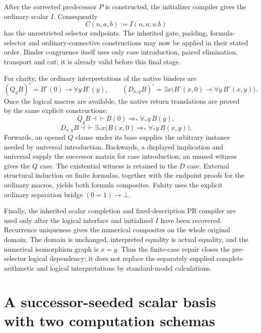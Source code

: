 \documentclass[11pt,letterpaper]{article}
\theoremstyle{definition}\newtheorem{definition}[theorem]{Definition}
\theoremstyle{remark}\newtheorem{remark}[theorem]{Remark}
\begin{document}
After the corrected predecessor $P$ is constructed, the initializer
compiler gives the ordinary scalar $I$.  Consequently
\[
 C(n,a,b):=I(n,a;u.b)
\]
has the unrestricted selector endpoints.  The inherited gate, padding,
formula-selector and ordinary-connective constructions may now be applied
in their stated order.  Binder congruence itself uses only case
introduction, paired elimination, transport and cut; it is already valid
before this final stage.

For clarity, the ordinary interpretations of the native binders are
\[
 (Q_yB)^\circ=B^\circ(0)\to\forall y\,B^\circ(y),\qquad
 (D_{x,y}B)^\circ=
 \exists x\bigl(B^\circ(x,0)\to\forall y\,B^\circ(x,y)\bigr).
\]
Once the logical macros are available, the native return translations
are proved by the same explicit constructions:
\[
 Q_yB\dashv\vdash B(0)\Rightarrow_*\forall_*y\,B(y),
\]
\[
 D_{x,y}B\dashv\vdash
 \exists_*x\bigl(B(x,0)\Rightarrow_*\forall_*y\,B(x,y)\bigr).
\]
Forwards, an opened $Q$ clause under its base supplies the arbitrary
instance needed by universal introduction.  Backwards, a displayed
implication and universal supply the successor matrix for case
introduction; an unused witness gives the $Q$ case.  The existential
witness is retained in the $D$ case.  External structural induction on
finite formulas, together with the endpoint proofs for the ordinary
macros, yields both formula composites.  Falsity uses the explicit
ordinary separation bridge $(0=1)\to\bot$.

Finally, the inherited scalar completion and fixed-description PR
compiler are used only after the logical interface and initialized $I$
have been recovered.  Recurrence uniqueness gives the numerical
composites on the whole original domain.  The domain is unchanged,
interpreted equality is actual equality, and the numerical isomorphism
graph is $x=y$.  Thus the finite-case repair closes the pre-selector
logical dependency; it does not replace the separately supplied complete
arithmetic and logical interpretations by standard-model calculations.


\section{A successor-seeded scalar basis with two computation schemas}
\label{js:section}
\end{document}
